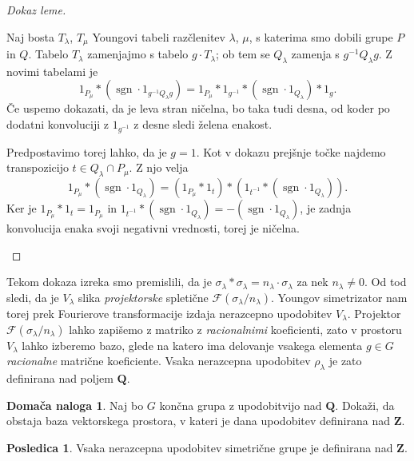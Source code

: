\documentclass[11pt]{book}
\def\ZZ{\mathbf{Z}}
\def\QQ{\mathbf{Q}}
\def\Fcal{\mathcal{F}}
\def\youngsym{\sigma_{\lambda}}
\DeclareMathOperator\sgn{sgn}
\theoremstyle{definition}
\theoremstyle{zgled}
\theoremstyle{odprtproblem}
\theoremstyle{domacanaloga}
\newtheorem*{domacanaloga}{Domača naloga}
\newenvironment{dokaz}
    {\color{siva}\begin{proof}}
    {\end{proof}}
\theoremstyle{izrek}
\newtheorem*{posledica}{Posledica}
\begin{document}
\begin{dokaz}[Dokaz leme]
\begin{enumerate}
    Naj bosta $T_{\lambda}$, $T_{\mu}$ Youngovi tabeli razčlenitev $\lambda$, $\mu$, s katerima smo dobili grupe $P$ in $Q$. Tabelo $T_{\lambda}$ zamenjajmo s tabelo $g \cdot T_{\lambda}$; ob tem se $Q_{\lambda}$ zamenja s $g^{-1} Q_{\lambda} g$. Z novimi tabelami je
    \[
        1_{P_\mu} * (\sgn \cdot 1_{g^{-1} Q_{\lambda} g}) = 1_{P_\mu} * 1_{g^{-1}} * (\sgn \cdot 1_{Q_{\lambda}}) * 1_g.
    \]
    Če uspemo dokazati, da je leva stran ničelna, bo taka tudi desna, od koder po dodatni konvoluciji z $1_{g^{-1}}$ z desne sledi želena enakost.

    Predpostavimo torej lahko, da je $g = 1$. Kot v dokazu prejšnje točke najdemo transpozicijo $t \in Q_{\lambda} \cap P_{\mu}$. Z njo velja
    \[
        1_{P_{\mu}} * (\sgn \cdot 1_{Q_{\lambda}}) = 
        \left( 1_{P_{\mu}} * 1_t \right) * \left( 1_{t^{-1}} * (\sgn \cdot 1_{Q_{\lambda}}) \right).
    \]
    Ker je $1_{P_{\mu}} * 1_t = 1_{P_{\mu}}$ in $1_{t^{-1}} * (\sgn \cdot 1_{Q_{\lambda}}) = - (\sgn \cdot 1_{Q_{\lambda}})$, je zadnja konvolucija enaka svoji negativni vrednosti, torej je ničelna.
\end{enumerate}
\end{dokaz}

Tekom dokaza izreka smo premislili, da je $\youngsym * \youngsym = n_{\lambda} \cdot \youngsym$ za nek $n_{\lambda} \neq 0$. Od tod sledi, da je $V_{\lambda}$ slika \emph{projektorske} spletične $\Fcal(\youngsym / n_{\lambda})$. Youngov simetrizator nam torej prek Fourierove transformacije izdaja nerazcepno upodobitev $V_{\lambda}$. Projektor $\Fcal(\youngsym / n_{\lambda})$ lahko zapišemo z matriko z \emph{racionalnimi} koeficienti, zato v prostoru $V_{\lambda}$ lahko izberemo bazo, glede na katero ima delovanje vsakega elementa $g \in G$ \emph{racionalne} matrične koeficiente. Vsaka nerazcepna upodobitev $\rho_{\lambda}$ je zato definirana nad poljem $\QQ$.

\begin{domacanaloga}
Naj bo $G$ končna grupa z upodobitvijo nad $\QQ$. Dokaži, da obstaja baza vektorskega prostora, v kateri je dana upodobitev definirana nad $\ZZ$.
\end{domacanaloga}

\begin{posledica}
Vsaka nerazcepna upodobitev simetrične grupe je definirana nad $\ZZ$.
\end{posledica}    
\end{document}
